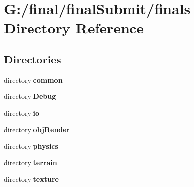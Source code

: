\section{G\-:/final/final\-Submit/finals Directory Reference}
\label{dir_123c18c89ec5aec44439265c8c1d4eac}
\subsection*{Directories}
\begin{DoxyCompactItemize}
\item 
directory {\bf common}
\item 
directory {\bf Debug}
\item 
directory {\bf io}
\item 
directory {\bf obj\-Render}
\item 
directory {\bf physics}
\item 
directory {\bf terrain}
\item 
directory {\bf texture}
\end{DoxyCompactItemize}
